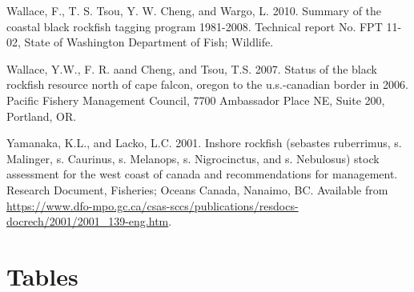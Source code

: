 \documentclass[11pt,
  letterpaper,
]{article}
\newlength{\cslhangindent}
\newenvironment{CSLReferences}[2] %
 {%
  \setlength{\parindent}{0pt}
  \ifodd #1 \everypar{\setlength{\hangindent}{\cslhangindent}}\ignorespaces\fi
  \ifnum #2 > 0
  \setlength{\parskip}{#2\baselineskip}
  \fi
 }%
 {}
\begin{document}
\begin{CSLReferences}{1}{0}
\leavevmode{}%
Wallace, F., T. S. Tsou, Y. W. Cheng, and Wargo, L. 2010. Summary of the coastal black rockfish tagging program 1981-2008. Technical report No. FPT 11-02, State of Washington Department of Fish; Wildlife.

\leavevmode{}%
Wallace, Y.W., F. R. aand Cheng, and Tsou, T.S. 2007. Status of the black rockfish resource north of cape falcon, oregon to the u.s.-canadian border in 2006. Pacific Fishery Management Council, 7700 Ambassador Place NE, Suite 200, Portland, OR.

\leavevmode{}%
Yamanaka, K.L., and Lacko, L.C. 2001. Inshore rockfish (sebastes ruberrimus, s. Malinger, s. Caurinus, s. Melanops, s. Nigrocinctus, and s. Nebulosus) stock assessment for the west coast of canada and recommendations for management. Research Document, Fisheries; Oceans Canada, Nanaimo, {BC}. Available from \url{https://www.dfo-mpo.gc.ca/csas-sccs/publications/resdocs-docrech/2001/2001_139-eng.htm}.

\end{CSLReferences}

\clearpage

\hypertarget{tables}{%
\section{Tables}\label{tables}}
























\end{document}

